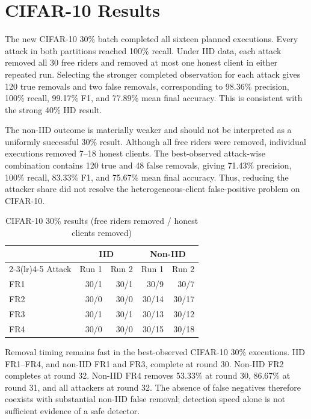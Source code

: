 \section{CIFAR-10 Results}

The new CIFAR-10 30\% batch completed all sixteen planned executions. Every attack in both partitions reached 100\% recall. Under IID data, each attack removed all 30 free riders and removed at most one honest client in either repeated run. Selecting the stronger completed observation for each attack gives 120 true removals and two false removals, corresponding to 98.36\% precision, 100\% recall, 99.17\% F1, and 77.89\% mean final accuracy. This is consistent with the strong 40\% IID result.

The non-IID outcome is materially weaker and should not be interpreted as a uniformly successful 30\% result. Although all free riders were removed, individual executions removed 7--18 honest clients. The best-observed attack-wise combination contains 120 true and 48 false removals, giving 71.43\% precision, 100\% recall, 83.33\% F1, and 75.67\% mean final accuracy. Thus, reducing the attacker share did not resolve the heterogeneous-client false-positive problem on CIFAR-10.

\begin{table}[htbp]
\centering
\caption{CIFAR-10 30\% results (free riders removed / honest clients removed)}
\label{tab:cifar30-detail}
\begin{tabular}{lrrrr}
\toprule
& \multicolumn{2}{c}{IID} & \multicolumn{2}{c}{Non-IID} \\
\cmidrule(lr){2-3}\cmidrule(lr){4-5}
Attack & Run 1 & Run 2 & Run 1 & Run 2 \\
\midrule
FR1 & 30/1 & 30/1 & 30/9 & 30/7 \\
FR2 & 30/0 & 30/0 & 30/14 & 30/17 \\
FR3 & 30/1 & 30/1 & 30/13 & 30/12 \\
FR4 & 30/0 & 30/0 & 30/15 & 30/18 \\
\bottomrule
\end{tabular}
\end{table}

Removal timing remains fast in the best-observed CIFAR-10 30\% executions. IID FR1--FR4, and non-IID FR1 and FR3, complete at round 30. Non-IID FR2 completes at round 32. Non-IID FR4 removes 53.33\% at round 30, 86.67\% at round 31, and all attackers at round 32. The absence of false negatives therefore coexists with substantial non-IID false removal; detection speed alone is not sufficient evidence of a safe detector.

